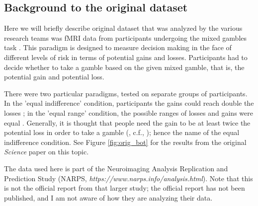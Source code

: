 \subsection{Background to the original dataset}
Here we will briefly describe original dataset that was analyzed by the various research teams was fMRI data from participants undergoing the mixed gambles task \citep{tom_neural_2007}. This paradigm is designed to measure decision making in the face of different levels of risk in terms of potential gains and losses. Participants had to decide whether to take a gamble based on the given mixed gamble, that is, the potential gain and potential loss. 

There were two particular paradigms, tested on separate groups of participants. In the 'equal indifference' condition, participants the gains could reach double the losses \citep{tom_neural_2007}; in the 'equal range' condition, the possible ranges of losses and gains were equal \citep{de_martino_amygdala_2010}. Generally, it is thought that people need the gain to be at least twice the potential loss in order to take a gamble (\citealp{tversky1992advances, kahneman1991anomalies, kahneman1990experimental, abdellaoui2007loss}, c.f., \citealp{gal2018loss}); hence the name of the equal indifference condition. See Figure \ref{fig:orig_bot} for the results from the original \textit{Science} paper on this topic. 

The data used here is part of the Neuroimaging Analysis Replication and Prediction Study (NARPS, \textit{https://www.narps.info/analysis.html}). Note that this is not the official report from that larger study; the official report has not been published, and I am not aware of how they are analyzing their data. 

